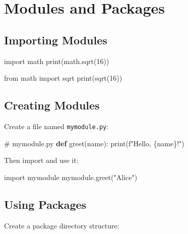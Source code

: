 \documentclass[
  letterpaper,
  DIV=11,
  numbers=noendperiod]{scrreprt}
\newenvironment{Shaded}{\begin{snugshade}}{\end{snugshade}}
\newcommand{\BuiltInTok}[1]{\textcolor[rgb]{0.00,0.23,0.31}{#1}}
\newcommand{\CommentTok}[1]{\textcolor[rgb]{0.37,0.37,0.37}{#1}}
\newcommand{\DecValTok}[1]{\textcolor[rgb]{0.68,0.00,0.00}{#1}}
\newcommand{\ImportTok}[1]{\textcolor[rgb]{0.00,0.46,0.62}{#1}}
\newcommand{\KeywordTok}[1]{\textcolor[rgb]{0.00,0.23,0.31}{\textbf{#1}}}
\newcommand{\NormalTok}[1]{\textcolor[rgb]{0.00,0.23,0.31}{#1}}
\newcommand{\SpecialCharTok}[1]{\textcolor[rgb]{0.37,0.37,0.37}{#1}}
\newcommand{\SpecialStringTok}[1]{\textcolor[rgb]{0.13,0.47,0.30}{#1}}
\newcommand{\StringTok}[1]{\textcolor[rgb]{0.13,0.47,0.30}{#1}}
\begin{document}
\section{Modules and Packages}\label{modules-and-packages}

\subsection{Importing Modules}\label{importing-modules-1}

\begin{Shaded}
\begin{Highlighting}[]
\ImportTok{import}\NormalTok{ math}
\BuiltInTok{print}\NormalTok{(math.sqrt(}\DecValTok{16}\NormalTok{))}

\ImportTok{from}\NormalTok{ math }\ImportTok{import}\NormalTok{ sqrt}
\BuiltInTok{print}\NormalTok{(sqrt(}\DecValTok{16}\NormalTok{))}
\end{Highlighting}
\end{Shaded}

\subsection{Creating Modules}\label{creating-modules}

Create a file named \texttt{mymodule.py}:

\begin{Shaded}
\begin{Highlighting}[]
\CommentTok{\# mymodule.py}
\KeywordTok{def}\NormalTok{ greet(name):}
    \BuiltInTok{print}\NormalTok{(}\SpecialStringTok{f"Hello, }\SpecialCharTok{\{}\NormalTok{name}\SpecialCharTok{\}}\SpecialStringTok{!"}\NormalTok{)}
\end{Highlighting}
\end{Shaded}

Then import and use it:

\begin{Shaded}
\begin{Highlighting}[]
\ImportTok{import}\NormalTok{ mymodule}
\NormalTok{mymodule.greet(}\StringTok{"Alice"}\NormalTok{)}
\end{Highlighting}
\end{Shaded}

\subsection{Using Packages}\label{using-packages}

Create a package directory structure:
\end{document}

